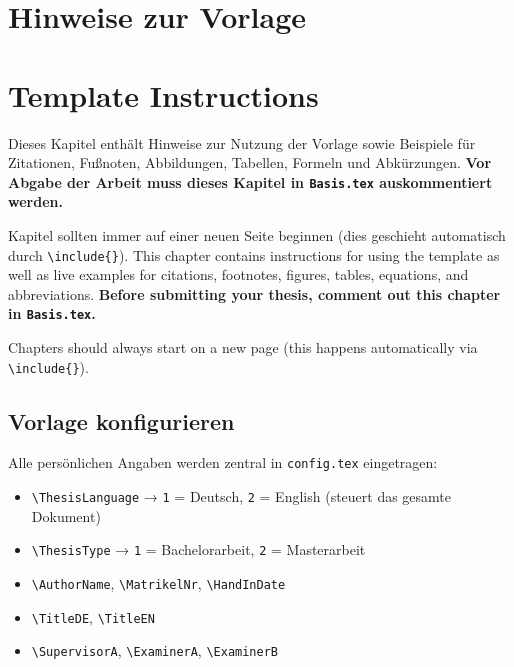 %
%

\ifnum{}
  \chapter{Hinweise zur Vorlage}
\else
  \chapter{Template Instructions}
\fi
\label{ch:hinweise}

\ifnum{}
  Dieses Kapitel enthält Hinweise zur Nutzung der Vorlage sowie Beispiele für Zitationen, Fußnoten, Abbildungen, Tabellen, Formeln und Abkürzungen. \textbf{Vor Abgabe der Arbeit muss dieses Kapitel in \texttt{Basis.tex} auskommentiert werden.}

  Kapitel sollten immer auf einer neuen Seite beginnen
  (dies geschieht automatisch durch \texttt{\textbackslash include\{\}}).
\else
  This chapter contains instructions for using the template as well as live examples for citations, footnotes, figures, tables, equations, and abbreviations. \textbf{Before submitting your thesis, comment out this chapter in \texttt{Basis.tex}.}

  Chapters should always start on a new page
  (this happens automatically via \texttt{\textbackslash include\{\}}).
\fi


\ifnum{}
  \section{Vorlage konfigurieren}
  Alle persönlichen Angaben werden zentral in \texttt{config.tex} eingetragen:
  \begin{itemize}
    \item \verb|\ThesisLanguage| → \texttt{1} = Deutsch, \texttt{2} = English (steuert das gesamte Dokument)
    \item \verb|\ThesisType| → \texttt{1} = Bachelorarbeit, \texttt{2} = Masterarbeit
    \item \verb|\AuthorName|, \verb|\MatrikelNr|, \verb|\HandInDate|
    \item \verb|\TitleDE|, \verb|\TitleEN|
    \item \verb|\SupervisorA|, \verb|\ExaminerA|, \verb|\ExaminerB|
  \end{itemize}

